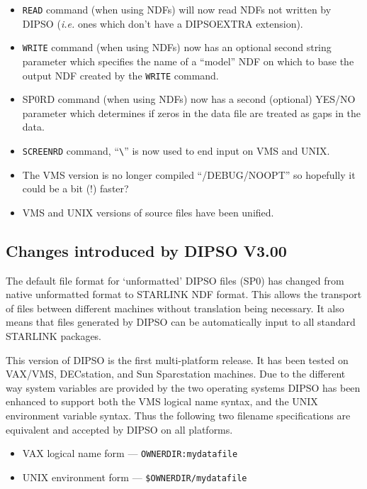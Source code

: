\documentclass[twoside,11pt]{article}
\newcommand{\htmlref}[2]{#1}
\renewcommand{\_}{\texttt{\symbol{95}}}
\begin{document}
\begin{itemize}
\item \htmlref{{\tt{READ}}}{COM:READ}  command (when using NDFs) will now read NDFs not written by
DIPSO ({\em i.e.} ones which don't have a DIPSO\_EXTRA extension).

\item \htmlref{{\tt{WRITE}}}{COM:WRITE}  command (when using NDFs) now has an optional second string
parameter which specifies the name of a ``model'' NDF on which to base
the output NDF created by the \htmlref{{\tt{WRITE}}}{COM:WRITE}  command.

\item SP0RD command (when using NDFs) now has a second (optional)
YES/NO parameter which determines if zeros in the data file are treated
as gaps in the data.

\item \htmlref{{\tt{SCREENRD}}}{COM:SCREENRD}  command, ``\verb+\+'' is now used to end input on VMS
and UNIX.

\item The VMS version is no longer compiled ``/DEBUG/NOOPT'' so
hopefully it could be a bit (!) faster?

\item VMS and UNIX versions of source files have been unified.

\end{itemize}

\subsection{ Changes introduced by DIPSO V3.00}

The default file format for `unformatted' DIPSO files (SP0) has
changed from native unformatted format to STARLINK NDF format. This
allows the transport of files between different machines without
translation being necessary. It also means that files generated by
DIPSO can be automatically input to all standard STARLINK packages.

This version of DIPSO is the first multi-platform release. It has been
tested on VAX/VMS, DECstation, and Sun Sparcstation machines.
Due to the different way system variables are provided by the two
operating systems DIPSO has been enhanced to support both the VMS
logical name syntax, and the UNIX environment variable syntax. Thus
the following two filename specifications are equivalent and accepted
by DIPSO on all platforms.

\begin{itemize}
\item{VAX logical name form --- {\tt{OWNERDIR:my\_data\_file}}} 
\item{UNIX environment form --- {\tt{\$OWNERDIR/my\_data\_file}}} 
\end{itemize}
\end{document}
